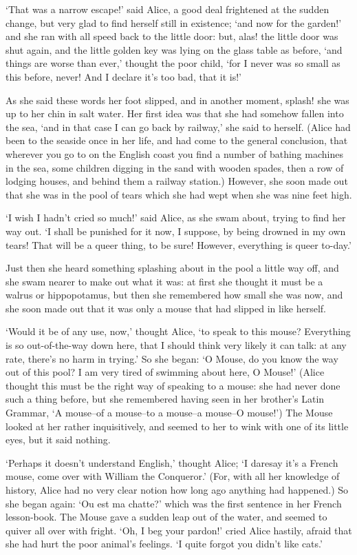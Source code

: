\documentclass[statementpaper,twoside,openany]{memoir}
\begin{document}
`That was a narrow escape!' said Alice, a good deal frightened at the sudden change, but very glad to find herself still in existence; `and now for the garden!' and she ran with all speed back to the little door: but, alas! the little door was shut again, and the little golden key was lying on the glass table as before, `and things are worse than ever,' thought the poor child, `for I never was so small as this before, never! And I declare it's too bad, that it is!'

As she said these words her foot slipped, and in another moment, splash! she was up to her chin in salt water. Her first idea was that she had somehow fallen into the sea, `and in that case I can go back by railway,' she said to herself. (Alice had been to the seaside once in her life, and had come to the general conclusion, that wherever you go to on the English coast you find a number of bathing machines in the sea, some children digging in the sand with wooden spades, then a row of lodging houses, and behind them a railway station.) However, she soon made out that she was in the pool of tears which she had wept when she was nine feet high.

`I wish I hadn't cried so much!' said Alice, as she swam about, trying to find her way out. `I shall be punished for it now, I suppose, by being drowned in my own tears! That will be a queer thing, to be sure! However, everything is queer to-day.'

Just then she heard something splashing about in the pool a little way off, and she swam nearer to make out what it was: at first she thought it must be a walrus or hippopotamus, but then she remembered how small she was now, and she soon made out that it was only a mouse that had slipped in like herself.

`Would it be of any use, now,' thought Alice, `to speak to this mouse? Everything is so out-of-the-way down here, that I should think very likely it can talk: at any rate, there's no harm in trying.' So she began: `O Mouse, do you know the way out of this pool? I am very tired of swimming about here, O Mouse!' (Alice thought this must be the right way of speaking to a mouse: she had never done such a thing before, but she remembered having seen in her brother's Latin Grammar, `A mouse--of a mouse--to a mouse--a mouse--O mouse!') The Mouse looked at her rather inquisitively, and seemed to her to wink with one of its little eyes, but it said nothing.

`Perhaps it doesn't understand English,' thought Alice; `I daresay it's a French mouse, come over with William the Conqueror.' (For, with all her knowledge of history, Alice had no very clear notion how long ago anything had happened.) So she began again: `Ou est ma chatte?' which was the first sentence in her French lesson-book. The Mouse gave a sudden leap out of the water, and seemed to quiver all over with fright. `Oh, I beg your pardon!' cried Alice hastily, afraid that she had hurt the poor animal's feelings. `I quite forgot you didn't like cats.'
\end{document}
